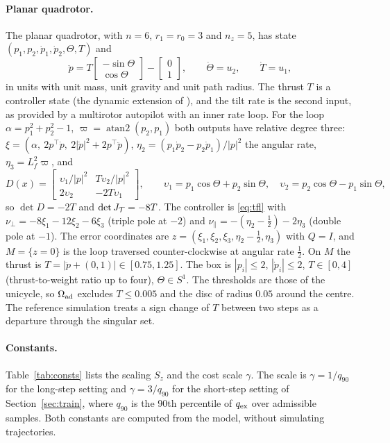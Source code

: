 \paragraph{Planar quadrotor.} The planar quadrotor, with $n=6$, $r_1=r_0=3$ and $n_z=5$, has state $(p_1,p_2,\dot p_1,\dot p_2,\Theta,T)$ and
\begin{equation}\label{eq:quad}
\ddot p=T\begin{bmatrix}-\sin\Theta\\ \cos\Theta\end{bmatrix}-\begin{bmatrix}0\\1\end{bmatrix},\qquad
\dot\Theta=u_2,\qquad \dot T=u_1,
\end{equation}
in units with unit mass, unit gravity and unit path radius. The thrust $T$ is a controller state (the dynamic extension of \citet{akhtar2012}), and the tilt rate is the second input, as provided by a multirotor autopilot with an inner rate loop. For the loop $\alpha=p_1^2+p_2^2-1$, $\varpi=\operatorname{atan2}(p_2,p_1)$ both outputs have relative degree three: $\xi=(\alpha,\ 2p^\top\dot p,\ 2|\dot p|^2+2p^\top\ddot p)$, $\eta_2=(p_1\dot p_2-p_2\dot p_1)/|p|^2$ the angular rate, $\eta_3=L_f^2\varpi$, and
\begin{equation}
D(x)=\begin{bmatrix}\upsilon_1/|p|^2 & T\upsilon_2/|p|^2\\ 2\upsilon_2 & -2T\upsilon_1\end{bmatrix},\qquad
\upsilon_1=p_1\cos\Theta+p_2\sin\Theta,\quad \upsilon_2=p_2\cos\Theta-p_1\sin\Theta,
\end{equation}
so $\det D=-2T$ and $\det J_\mathcal T=-8T$. The controller is \eqref{eq:tfl} with $\nu_\perp=-8\xi_1-12\xi_2-6\xi_3$ (triple pole at $-2$) and $\nu_\parallel=-(\eta_2-\tfrac12)-2\eta_3$ (double pole at $-1$). The error coordinates are $z=(\xi_1,\xi_2,\xi_3,\eta_2-\tfrac12,\eta_3)$ with $Q=I$, and $M=\{z=0\}$ is the loop traversed counter-clockwise at angular rate $\tfrac12$. On $M$ the thrust is $T=|\ddot p+(0,1)|\in[0.75,1.25]$. The box is $|p_i|\le2$, $|\dot p_i|\le2$, $T\in[0,4]$ (thrust-to-weight ratio up to four), $\Theta\in S^1$. The thresholds are those of the unicycle, so $\Omega_{\mathrm{ad}}$ excludes $T\le0.005$ and the disc of radius $0.05$ around the centre. The reference simulation treats a sign change of $T$ between two steps as a departure through the singular set.

\paragraph{Constants.} Table~\ref{tab:consts} lists the scaling $S_z$ and the cost scale $\gamma$. The scale is $\gamma=1/q_{90}$ for the long-step setting and $\gamma=3/q_{90}$ for the short-step setting of Section~\ref{sec:train}, where $q_{90}$ is the 90th percentile of $q_{\mathrm{ex}}$ over admissible samples. Both constants are computed from the model, without simulating trajectories.


